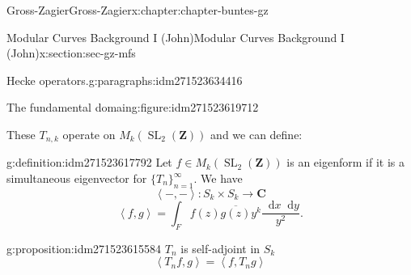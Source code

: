 \documentclass[oneside,10pt,]{book}
\numberwithin{equation}{section}
\newcommand{\diff}{\mathop{}\!\mathrm{d}}
\newcommand{\pair}[2]{\left\langle #1, #2 \right\rangle}
\newcommand{\ZZ}{\mathbf{Z}}
\newcommand{\CC}{\mathbf{C}}
\DeclareMathOperator{\SL}{SL}
\begin{document}
\begin{chapterptx}{Gross-Zagier}{}{Gross-Zagier}{}{}{x:chapter:chapter-buntes-gz}
\begin{sectionptx}{Modular Curves Background I (John)}{}{Modular Curves Background I (John)}{}{}{x:section:sec-gz-mfs}
\begin{paragraphs}{Hecke operators.}{g:paragraphs:idm271523634416}
\begin{figureptx}{The fundamental domain}{g:figure:idm271523619712}{}
\begin{image}{0}{1}{0}
{
}%
\end{image}%
\tcblower
\end{figureptx}%
These \(T_{n,k}\) operate on \(M_k(\SL_2(\ZZ))\) and we can define:%
\begin{definition}{}{g:definition:idm271523617792}%
Let \(f\in M_k(\SL_2(\ZZ))\) is an eigenform if it is a simultaneous eigenvector for \(\{T_n\}_{n=1}^\infty \). We have%
\begin{equation*}
\pair - - \colon  S_k \times S_k\to \CC
\end{equation*}
%
\begin{equation*}
\pair fg = \int_F f(z) \overline{g(z)} y^k \frac{\diff x \diff y}{y^2}\text{.}
\end{equation*}
%
\end{definition}
\begin{proposition}{}{}{g:proposition:idm271523615584}%
\(T_n\) is self-adjoint in \(S_k\)%
\begin{equation*}
\pair{T_n f}{g}=  \pair {f}{T_ng} 
\end{equation*}

\end{proposition}
\end{paragraphs}
\end{sectionptx}
\end{chapterptx}
\end{document}
